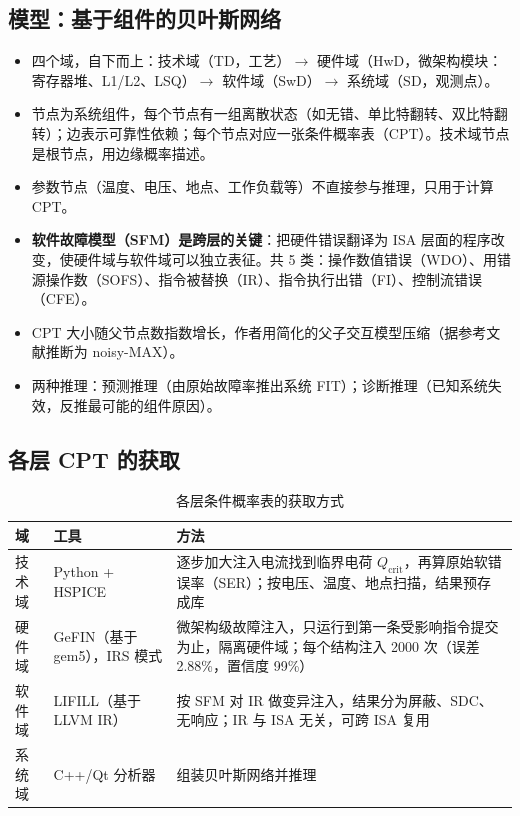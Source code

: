 \documentclass[11pt,a4paper]{ctexart}
\begin{document}
\subsection{模型：基于组件的贝叶斯网络}
\begin{itemize}[leftmargin=*]
  \item 四个域，自下而上：技术域（TD，工艺）$\rightarrow$ 硬件域（HwD，微架构模块：寄存器堆、L1/L2、LSQ）$\rightarrow$ 软件域（SwD）$\rightarrow$ 系统域（SD，观测点）。
  \item 节点为系统组件，每个节点有一组离散状态（如无错、单比特翻转、双比特翻转）；边表示可靠性依赖；每个节点对应一张条件概率表（CPT）。技术域节点是根节点，用边缘概率描述。
  \item 参数节点（温度、电压、地点、工作负载等）不直接参与推理，只用于计算 CPT。
  \item \textbf{软件故障模型（SFM）是跨层的关键}：把硬件错误翻译为 ISA 层面的程序改变，使硬件域与软件域可以独立表征。共 5 类：操作数值错误（WDO）、用错源操作数（SOFS）、指令被替换（IR）、指令执行出错（FI）、控制流错误（CFE）。
  \item CPT 大小随父节点数指数增长，作者用简化的父子交互模型压缩（据参考文献推断为 noisy-MAX）。
  \item 两种推理：预测推理（由原始故障率推出系统 FIT）；诊断推理（已知系统失效，反推最可能的组件原因）。
\end{itemize}

\subsection{各层 CPT 的获取}
\begin{table}[h]
\centering
\small
\begin{tabularx}{\textwidth}{@{}llX@{}}
\toprule
域 & 工具 & 方法 \\
\midrule
技术域 & Python + HSPICE & 逐步加大注入电流找到临界电荷 $Q_{\text{crit}}$，再算原始软错误率（SER）；按电压、温度、地点扫描，结果预存成库 \\
硬件域 & GeFIN（基于 gem5），IRS 模式 & 微架构级故障注入，只运行到第一条受影响指令提交为止，隔离硬件域；每个结构注入 2000 次（误差 2.88\%，置信度 99\%） \\
软件域 & LIFILL（基于 LLVM IR） & 按 SFM 对 IR 做变异注入，结果分为屏蔽、SDC、无响应；IR 与 ISA 无关，可跨 ISA 复用 \\
系统域 & C++/Qt 分析器 & 组装贝叶斯网络并推理 \\
\bottomrule
\end{tabularx}
\caption{各层条件概率表的获取方式}
\end{table}
\end{document}
